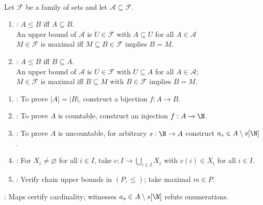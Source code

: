 \begin{definition} \label{def:inclusion-and-containment-orders-for-zorn} \\
Let $\mathcal{F}$ be a family of sets and let $\mathcal{A}\subseteq\mathcal{F}$.
\begin{enumerate}[label=(\roman*)]
\setlength{\itemsep}{0pt}
\item {}: $A\leq B$ iff $A\subseteq B$.\\
An upper bound of $\mathcal{A}$ is $U\in\mathcal{F}$ with $A\subseteq U$ for all $A\in\mathcal{A}$\\
$M\in\mathcal{F}$ is maximal iff $M\subseteq B\in\mathcal{F}$ implies $B=M$.
\item {}: $A\leq B$ iff $B\subseteq A$.\\
An upper bound of $\mathcal{A}$ is $U\in\mathcal{F}$ with $U\subseteq A$ for all $A\in\mathcal{A}$;\\
$M\in\mathcal{F}$ is maximal iff $B\subseteq M$ with $B\in\mathcal{F}$ implies $B=M$.
\end{enumerate}
\end{definition}

\begin{method} \label{meth:cardinality-proof-patterns}\label{meth:cardinality-proof-patterns-source-todo} 
\begin{enumerate}[label=(\roman*)]
\setlength{\itemsep}{0pt}
\item {}: To prove $|A|=|B|$, construct a bijection $f:A\to B$.
\item {}: To prove $A$ is countable, construct an injection $f:A\to\N$.
\item {}: To prove $A$ is uncountable, for arbitrary $s:\N\to A$ construct $a_s\in A\setminus s[\N]$.
\item {}: For $X_i\neq\varnothing$ for all $i\in I$, take $c:I\to\bigcup_{i\in I}X_i$ with $c(i)\in X_i$ for all $i\in I$.
\item {}: Verify chain upper bounds in $(P,\leq)$; take maximal $m\in P$.
\end{enumerate}
: Maps certify cardinality; witnesses $a_s\in A\setminus s[\N]$ refute enumerations.
\end{method}

